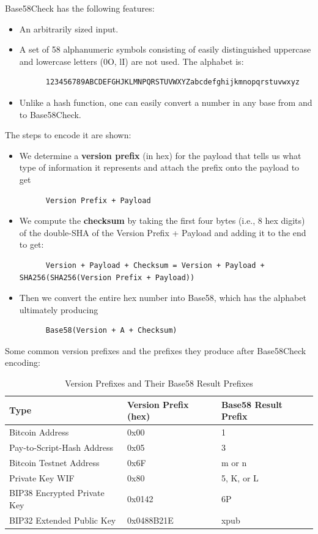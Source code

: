 \documentclass{article}
\newcounter{code}[section]
\begin{document}
  Base58Check has the following features:
  \begin{itemize}
    \item An arbitrarily sized input.
    \item A set of 58 alphanumeric symbols consisting of easily distinguished uppercase and lowercase letters (0O, lI) are not used. The alphabet is:
    \begin{lstlisting}
      123456789ABCDEFGHJKLMNPQRSTUVWXYZabcdefghijkmnopqrstuvwxyz
    \end{lstlisting}
    \item Unlike a hash function, one can easily convert a number in any base from and to Base58Check.
  \end{itemize}

  The steps to encode it are shown:
  \begin{itemize}
    \item We determine a \textbf{version prefix} (in hex) for the payload that tells us what type of information it represents and attach the prefix onto the payload to get
    \begin{lstlisting}
      Version Prefix + Payload
    \end{lstlisting}
    \item We compute the \textbf{checksum} by taking the first four bytes (i.e., 8 hex digits) of the double-SHA of the Version Prefix + Payload and adding it to the end to get:
    \begin{lstlisting}
      Version + Payload + Checksum = Version + Payload + SHA256(SHA256(Version Prefix + Payload))
    \end{lstlisting}
    \item Then we convert the entire hex number into Base58, which has the alphabet ultimately producing
    \begin{lstlisting}
      Base58(Version + A + Checksum)
    \end{lstlisting}
  \end{itemize}

  Some common version prefixes and the prefixes they produce after Base58Check encoding:

  \begin{table}[H]
  \centering
  \begin{tabular}{|l|l|l|}
  \hline
  \textbf{Type} & \textbf{Version Prefix (hex)} & \textbf{Base58 Result Prefix} \\
  \hline
  Bitcoin Address & 0x00 & 1 \\
  Pay-to-Script-Hash Address & 0x05 & 3 \\
  Bitcoin Testnet Address & 0x6F & m or n \\
  Private Key WIF & 0x80 & 5, K, or L \\
  BIP38 Encrypted Private Key & 0x0142 & 6P \\
  BIP32 Extended Public Key & 0x0488B21E & xpub \\
  \hline
  \end{tabular}
  \caption{Version Prefixes and Their Base58 Result Prefixes}
  \end{table}
\end{document}
